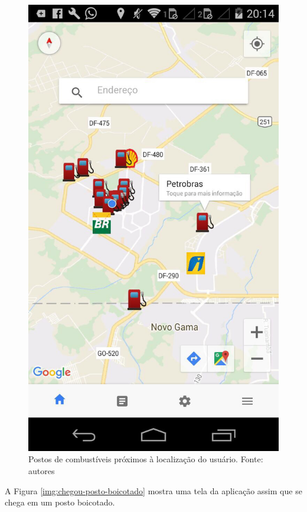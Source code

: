 \begin{figure}[H]
    \centering
    \includegraphics[scale=0.2]{figuras/app_2.jpg}
    \caption[Postos de combustíveis próximos]{Postos de combustíveis próximos à localização do usuário. Fonte: autores}
    \label{img:postos_de_gasolina_proximos}
\end{figure}

A Figura \ref{img:chegou-posto-boicotado} mostra uma tela da aplicação assim que se chega em um posto boicotado.

